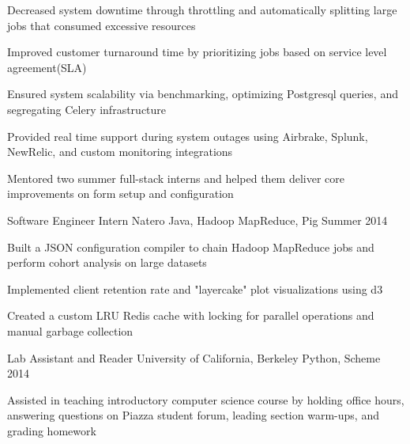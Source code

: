 \begin{cventries}
{\begin{cvitems}
        \item {Decreased system downtime through throttling and automatically splitting large jobs that consumed excessive resources}
        \item {Improved customer turnaround time by prioritizing jobs based on service level agreement(SLA)}
        \item {Ensured system scalability via benchmarking, optimizing Postgresql queries, and segregating Celery infrastructure}
        \item {Provided real time support during system outages using Airbrake, Splunk, NewRelic, and custom monitoring integrations}
        \item {Mentored two summer full-stack interns and helped them deliver core improvements on form setup and configuration}
      \end{cvitems}
    }
  \cventry
    {Software Engineer Intern}
    {Natero}
    {Java, Hadoop MapReduce, Pig}
    {Summer 2014}
    {
      \begin{cvitems}
        \item {Built a JSON configuration compiler to chain Hadoop MapReduce jobs and perform cohort analysis on large datasets}
        \item {Implemented client retention rate and "layercake" plot visualizations using d3}
        \item {Created a custom LRU Redis cache with locking for parallel operations and manual garbage collection}
      \end{cvitems}
    }
  \cventry
    {Lab Assistant and Reader}
    {University of California, Berkeley }
    {Python, Scheme}
    {2014}
    {
      \begin{cvitems}
      \item {Assisted in teaching introductory computer science course by holding office hours, answering questions on Piazza student forum, leading section warm-ups, and grading homework}
      \end{cvitems}
    }
\end{cventries}
